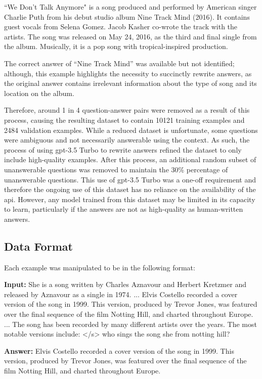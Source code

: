 \begin{itquote}
    ``We Don't Talk Anymore" is a song produced and performed by American singer Charlie Puth from his debut studio album Nine Track Mind (2016). It contains guest vocals from Selena Gomez. Jacob Kasher co-wrote the track with the artists. The song was released on May 24, 2016, as the third and final single from the album. Musically, it is a pop song with tropical-inspired production.
\end{itquote}

The correct answer of ``Nine Track Mind'' was available but not identified; although, this example highlights the necessity to succinctly rewrite answers, as the original answer contains irrelevant information about the type of song and its location on the album.

Therefore, around 1 in 4 question-answer pairs were removed as a result of this process, causing the resulting dataset to contain 10121 training examples and 2484 validation examples. While a reduced dataset is unfortunate, some questions were ambiguous and not necessarily answerable using the context. As such, the process of using \acrshort{gpt}-3.5 Turbo to rewrite answers refined the dataset to only include high-quality examples. After this process, an additional random subset of unanswerable questions was removed to maintain the 30\% percentage of unanswerable questions. This use of \acrshort{gpt}-3.5 Turbo was a one-off requirement and therefore the ongoing use of this dataset has no reliance on the availability of the \acrshort{api}. However, any model trained from this dataset may be limited in its capacity to learn, particularly if the answers are not as high-quality as human-written answers.


\subsection{Data Format}
Each example was manipulated to be in the following format:

\begin{itquote}
    \textbf{Input:} She is a song written by Charles Aznavour and Herbert Kretzmer and released by Aznavour as a single in 1974. ... Elvis Costello recorded a cover version of the song in 1999. This version, produced by Trevor Jones, was featured over the final sequence of the film Notting Hill, and charted throughout Europe. ... The song has been recorded by many different artists over the years. The most notable versions include: </s> who sings the song she from notting hill?
    
    \textbf{Answer:} Elvis Costello recorded a cover version of the song in 1999. This version, produced by Trevor Jones, was featured over the final sequence of the film Notting Hill, and charted throughout Europe.
\end{itquote}


